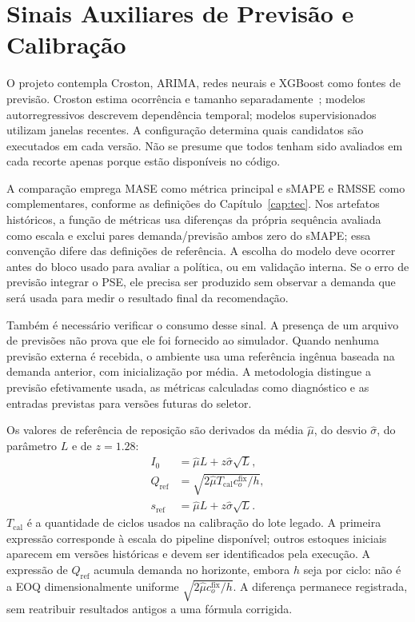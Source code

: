 \section{Sinais Auxiliares de Previsão e Calibração}
\label{sec:sinais_previsao}

O projeto contempla Croston, ARIMA, redes neurais e XGBoost como fontes de previsão. Croston estima ocorrência e tamanho separadamente~\citep{Croston1972ForecastingIntermittentDemand}; modelos autorregressivos descrevem dependência temporal; modelos supervisionados utilizam janelas recentes. A configuração determina quais candidatos são executados em cada versão. Não se presume que todos tenham sido avaliados em cada recorte apenas porque estão disponíveis no código.

A comparação emprega MASE como métrica principal e sMAPE e RMSSE como complementares, conforme as definições do Capítulo~\ref{cap:tec}. Nos artefatos históricos, a função de métricas usa diferenças da própria sequência avaliada como escala e exclui pares demanda/previsão ambos zero do sMAPE; essa convenção difere das definições de referência. A escolha do modelo deve ocorrer antes do bloco usado para avaliar a política, ou em validação interna. Se o erro de previsão integrar o PSE, ele precisa ser produzido sem observar a demanda que será usada para medir o resultado final da recomendação.

Também é necessário verificar o consumo desse sinal. A presença de um arquivo de previsões não prova que ele foi fornecido ao simulador. Quando nenhuma previsão externa é recebida, o ambiente usa uma referência ingênua baseada na demanda anterior, com inicialização por média. A metodologia distingue a previsão efetivamente usada, as métricas calculadas como diagnóstico e as entradas previstas para versões futuras do seletor.

Os valores de referência de reposição são derivados da média $\hat\mu$, do desvio $\hat\sigma$, do parâmetro $L$ e de $z=1.28$:
\begin{align}
I_0&=\hat\mu L+z\hat\sigma\sqrt L,\label{eq:I0_metod}\\
Q_{\mathrm{ref}}&=\sqrt{2\hat\mu T_{\mathrm{cal}}c_o^{\mathrm{fix}}/h},\label{eq:qref_metod}\\
s_{\mathrm{ref}}&=\hat\mu L+z\hat\sigma\sqrt L.\label{eq:sref_metod}
\end{align}
$T_{\mathrm{cal}}$ é a quantidade de ciclos usados na calibração do lote legado. A primeira expressão corresponde à escala do pipeline disponível; outros estoques iniciais aparecem em versões históricas e devem ser identificados pela execução. A expressão de $Q_{\mathrm{ref}}$ acumula demanda no horizonte, embora $h$ seja por ciclo: não é a EOQ dimensionalmente uniforme $\sqrt{2\hat\mu c_o^{\mathrm{fix}}/h}$. A diferença permanece registrada, sem reatribuir resultados antigos a uma fórmula corrigida.

